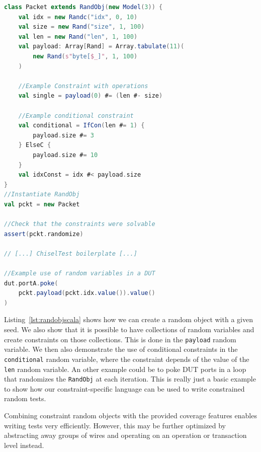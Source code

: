 \documentclass[conference]{IEEEtran}
\newcommand{\code}[1]{{\small{\texttt{#1}}}}
\begin{document}
\begin{lstlisting}[language=scala, caption={Random object toy example in Scala}, label={lst:randobjscala}]    
class Packet extends RandObj(new Model(3)) {
    val idx = new Randc("idx", 0, 10)
    val size = new Rand("size", 1, 100)
    val len = new Rand("len", 1, 100)
    val payload: Array[Rand] = Array.tabulate(11)(
        new Rand(s"byte[$_]", 1, 100)
    )

    //Example Constraint with operations
    val single = payload(0) #= (len #- size)
	
    //Example conditional constraint
    val conditional = IfCon(len #= 1) {
        payload.size #= 3
    } ElseC {
        payload.size #= 10
    }
    val idxConst = idx #< payload.size
}
//Instantiate RandObj
val pckt = new Packet

//Check that the constraints were solvable
assert(pckt.randomize)

// [...] ChiselTest boilerplate [...]

//Example use of random variables in a DUT
dut.portA.poke(
    pckt.payload(pckt.idx.value()).value()
)

\end{lstlisting}

Listing~\ref{lst:randobjscala} shows how we can create a random object with a given seed. We also show that it is possible to have collections of random variables and create constraints on those collections. This is done in the \texttt{payload} random variable. We then also demonstrate the use of conditional constraints in the \texttt{conditional} random variable, where the constraint depends of the value of the \texttt{len} random variable. An other example could be to poke DUT ports in a loop that randomizes the \texttt{RandObj} at each iteration. This is really just a basic example to show how our constraint-specific language can be used to write constrained random tests.


Combining constraint random objects with the provided coverage features enables writing tests very efficiently. However, this may be further optimized by abstracting away groups of wires and operating on an operation or transaction level instead.
\end{document}
